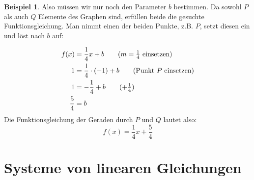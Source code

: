 \documentclass[%
11pt,%
twoside,%
titlepage,%
swissgerman,%
headsepline%
]{scrartcl}
\theoremstyle{definition}
\newtheorem{bsp}{Beispiel}[subsection] %
\theoremstyle{plain}
\begin{document}
\begin{bsp}
		Also müssen wir nur noch den Parameter $b$ bestimmen. Da sowohl $P$ als auch $Q$ Elemente des Graphen sind, erfüllen beide die gesuchte Funktionsgleichung. Man nimmt einen der beiden Punkte, z.B. $P$, setzt diesen ein und löst nach $b$ auf:
		
		\begin{align}
			f(x)&=\frac{1}{4}x+b\tag{$m=\frac{1}{4}$ einsetzen}\\
			1&=\frac{1}{4}\cdot(-1)+b\tag{Punkt $P$ einsetzen}\\
			1&=-\frac{1}{4}+b\tag{$+\frac{1}{4}$}\\
			\frac{5}{4}&=b\notag
		\end{align}
		Die Funktionsgleichung der Geraden durch $P$ und $Q$ lautet also:
		$$f(x)=\frac{1}{4}x+\frac{5}{4}$$
	\end{bsp}
	
	\section{Systeme von linearen Gleichungen}
	
\end{document}
